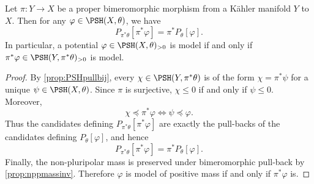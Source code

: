 \begin{proposition}\label{prop:Penvbimero}
    Let $\pi\colon Y\rightarrow X$ be a proper bimeromorphic morphism from a Kähler manifold $Y$ to $X$. Then for any $\varphi\in \PSH(X,\theta)$, we have
    \[
        P_{\pi^*\theta}[\pi^*\varphi]=\pi^*P_{\theta}[\varphi].
    \]
    In particular, a potential $\varphi\in \PSH(X,\theta)_{>0}$ is model if and only if $\pi^*\varphi\in \PSH(Y,\pi^*\theta)_{>0}$ is model.
\end{proposition}
\begin{proof}
    By \cref{prop:PSHpullbij}, every $\chi\in\PSH(Y,\pi^*\theta)$ is of the form $\chi=\pi^*\psi$ for a unique $\psi\in\PSH(X,\theta)$. Since $\pi$ is surjective, $\chi\leq 0$ if and only if $\psi\leq 0$. Moreover,
    \[
        \chi\preceq \pi^*\varphi \Longleftrightarrow \psi\preceq \varphi.
    \]
    Thus the candidates defining $P_{\pi^*\theta}[\pi^*\varphi]$ are exactly the pull-backs of the candidates defining $P_\theta[\varphi]$, and hence
    \[
        P_{\pi^*\theta}[\pi^*\varphi]=\pi^*P_\theta[\varphi].
    \]
    Finally, the non-pluripolar mass is preserved under bimeromorphic pull-back by \cref{prop:nppmassinv}. Therefore $\varphi$ is model of positive mass if and only if $\pi^*\varphi$ is.
\end{proof}

